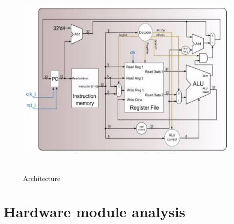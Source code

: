 \documentclass[12pt,a4paper]{article}
\theoremstyle{definition}
\begin{document}
\begin{figure}[H]
\centering
\includegraphics[height=10cm]{fig/cpu.png}
\caption{Architecture}
\label{fig:archi}
\end{figure}


\section{Hardware module analysis}
\end{document}
